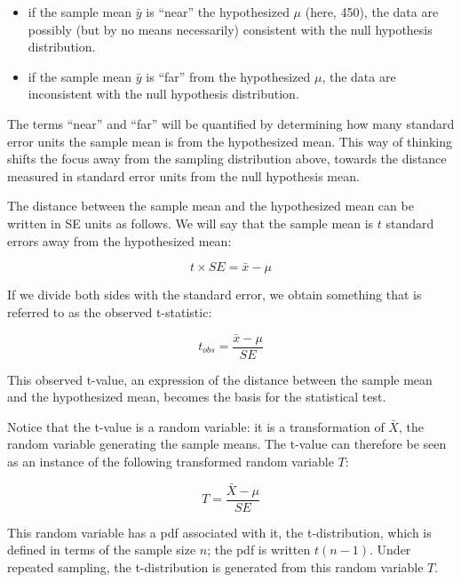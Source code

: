 \documentclass[
  12pt,
]{krantz}
\providecommand{\tightlist}{%
  \setlength{\itemsep}{0pt}\setlength{\parskip}{0pt}}
\theoremstyle{definition}
\theoremstyle{definition}
\theoremstyle{definition}
\theoremstyle{definition}
\theoremstyle{remark}
\begin{document}
\begin{itemize}
\tightlist
\item
  if the sample mean \(\bar{y}\) is ``near'' the hypothesized \(\mu\) (here, 450), the data are possibly (but by no means necessarily) consistent with the null hypothesis distribution.
\item
  if the sample mean \(\bar{y}\) is ``far'' from the hypothesized \(\mu\), the data are inconsistent with the null hypothesis distribution.
\end{itemize}

The terms ``near'' and ``far'' will be quantified by determining how many standard error units the sample mean is from the hypothesized mean. This way of thinking shifts the focus away from the sampling distribution above, towards the distance measured in standard error units from the null hypothesis mean.

The distance between the sample mean and the hypothesized mean can be written in SE units as follows. We will say that the sample mean is \(t\) standard errors away from the hypothesized mean:

\begin{equation}
t \times SE = \bar{x} - \mu 
\end{equation}

If we divide both sides with the standard error, we obtain something that is referred to as the observed t-statistic:

\begin{equation}
t_{obs}  = \frac{\bar{x} - \mu}{SE}
\end{equation}

This observed t-value, an expression of the distance between the sample mean and the hypothesized mean, becomes the basis for the statistical test.

Notice that the t-value is a random variable: it is a transformation of \(\bar{X}\), the random variable generating the sample means. The t-value can therefore be seen as an instance of the following transformed random variable \(T\):

\begin{equation}
T  = \frac{\bar{X} - \mu}{SE}
\end{equation}

This random variable has a pdf associated with it, the t-distribution, which is defined in terms of the sample size \(n\); the pdf is written \(t(n-1)\). Under repeated sampling, the t-distribution is generated from this random variable \(T\).
\end{document}
